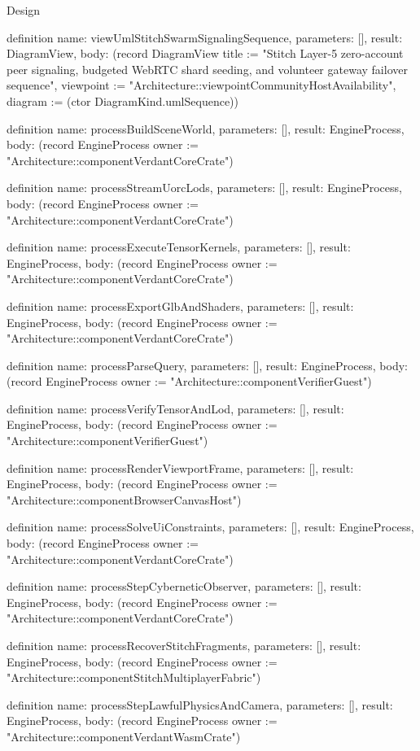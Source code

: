 \begin{lexlean}{Design}
\begin{semanticmodule}
definition{
  name: viewUmlStitchSwarmSignalingSequence,
  parameters: [],
  result: DiagramView,
  body: (record DiagramView {title := "Stitch Layer-5 zero-account peer signaling, budgeted WebRTC shard seeding, and volunteer gateway failover sequence", viewpoint := "Architecture::viewpointCommunityHostAvailability", diagram := (ctor DiagramKind.umlSequence)})
}

definition{
  name: processBuildSceneWorld,
  parameters: [],
  result: EngineProcess,
  body: (record EngineProcess {owner := "Architecture::componentVerdantCoreCrate"})
}

definition{
  name: processStreamUorcLods,
  parameters: [],
  result: EngineProcess,
  body: (record EngineProcess {owner := "Architecture::componentVerdantCoreCrate"})
}

definition{
  name: processExecuteTensorKernels,
  parameters: [],
  result: EngineProcess,
  body: (record EngineProcess {owner := "Architecture::componentVerdantCoreCrate"})
}

definition{
  name: processExportGlbAndShaders,
  parameters: [],
  result: EngineProcess,
  body: (record EngineProcess {owner := "Architecture::componentVerdantCoreCrate"})
}

definition{
  name: processParseQuery,
  parameters: [],
  result: EngineProcess,
  body: (record EngineProcess {owner := "Architecture::componentVerifierGuest"})
}

definition{
  name: processVerifyTensorAndLod,
  parameters: [],
  result: EngineProcess,
  body: (record EngineProcess {owner := "Architecture::componentVerifierGuest"})
}

definition{
  name: processRenderViewportFrame,
  parameters: [],
  result: EngineProcess,
  body: (record EngineProcess {owner := "Architecture::componentBrowserCanvasHost"})
}

definition{
  name: processSolveUiConstraints,
  parameters: [],
  result: EngineProcess,
  body: (record EngineProcess {owner := "Architecture::componentVerdantCoreCrate"})
}

definition{
  name: processStepCyberneticObserver,
  parameters: [],
  result: EngineProcess,
  body: (record EngineProcess {owner := "Architecture::componentVerdantCoreCrate"})
}

definition{
  name: processRecoverStitchFragments,
  parameters: [],
  result: EngineProcess,
  body: (record EngineProcess {owner := "Architecture::componentStitchMultiplayerFabric"})
}

definition{
  name: processStepLawfulPhysicsAndCamera,
  parameters: [],
  result: EngineProcess,
  body: (record EngineProcess {owner := "Architecture::componentVerdantWasmCrate"})
}


\end{semanticmodule}
\end{lexlean}
